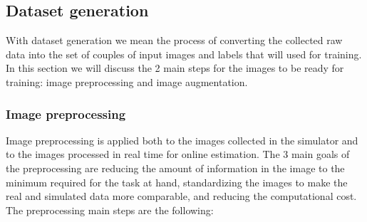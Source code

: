 \documentclass[a4paper,12pt,sort&compress]{article}
\begin{document}
\subsection{Dataset generation}
    With dataset generation we mean the process of converting the collected raw data into
    the set of couples of input images and labels that will used for training. In this section we
    will discuss the 2 main steps for the images to be ready for training: image preprocessing and
    image augmentation. 

    \subsubsection*{Image preprocessing}
    Image preprocessing is applied both to the images collected in the simulator and to the images
    processed in real time for online estimation. The 3 main goals of the preprocessing are reducing the 
    amount of information in the image to the minimum required for the task at hand, standardizing
    the images to make the real and simulated data more comparable, and reducing the computational 
    cost. The preprocessing main steps are the following:
\end{document}

